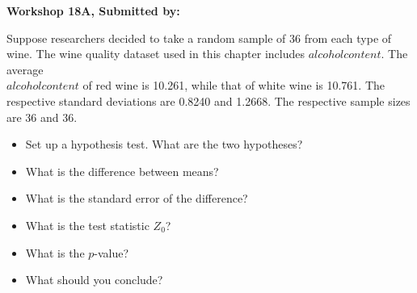 \documentclass[11pt]{book}\usepackage[]{graphicx}\usepackage[]{color}
\begin{document}
\begin{exercises}
\begin{exercise}
\end{exercise}
\begin{solution}  %

\end{solution}

\clearpage

    \begin{exercise}  %



    \begin{center}
\begin{flushleft}\textbf{\large \hfill Workshop 18A, Submitted by: }\end{flushleft}

\end{center}

Suppose researchers decided to take a random sample of 36 from each type of wine.  The wine quality dataset used in this chapter includes $alcohol content$. The average \\ $alcohol content$ of red wine is 10.261, while that of white wine is 10.761. The respective standard deviations are 0.8240 and 1.2668. The respective sample sizes are 36 and 36.

\begin{itemize}
  \item Set up a hypothesis test. What are the two hypotheses?
  \item What is the difference between means?
  \item What is the standard error of the difference?
  \item What is the test statistic $Z_0$?
  \item What is the $p$-value?
  \item What should you conclude?
\end{itemize}


\end{exercise}
\end{exercises}
\end{document}
